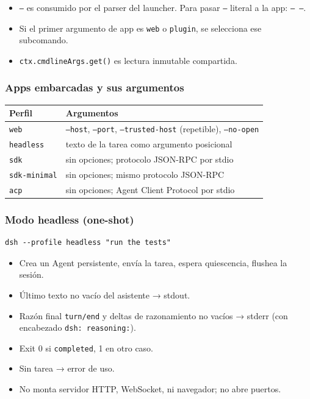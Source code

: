 \documentclass[11pt,a4paper]{article}
\begin{document}
\begin{itemize}[leftmargin=*,topsep=2pt,itemsep=1pt]
  \item \texttt{--} es consumido por el parser del launcher. Para pasar \texttt{--} literal a la app: \texttt{-- --}.
  \item Si el primer argumento de app es \texttt{web} o \texttt{plugin}, se selecciona ese subcomando.
  \item \texttt{ctx.cmdlineArgs.get()} es lectura inmutable compartida.
\end{itemize}


\subsubsection*{Apps embarcadas y sus argumentos}


\begin{center}
\begin{tabular}{@{}ll@{}}
\toprule
Perfil & Argumentos \\
\midrule
\texttt{web} & \texttt{--host}, \texttt{--port}, \texttt{--trusted-host} (repetible), \texttt{--no-open} \\
\texttt{headless} & texto de la tarea como argumento posicional \\
\texttt{sdk} & sin opciones; protocolo JSON-RPC por stdio \\
\texttt{sdk-minimal} & sin opciones; mismo protocolo JSON-RPC \\
\texttt{acp} & sin opciones; Agent Client Protocol por stdio \\
\bottomrule
\end{tabular}
\end{center}



\subsubsection*{Modo headless (one-shot)}


\begin{lstlisting}
dsh --profile headless "run the tests"
\end{lstlisting}


\begin{itemize}[leftmargin=*,topsep=2pt,itemsep=1pt]
  \item Crea un Agent persistente, envía la tarea, espera quiescencia, flushea la sesión.
  \item Último texto no vacío del asistente → stdout.
  \item Razón final \texttt{turn/end} y deltas de razonamiento no vacíos → stderr (con encabezado \texttt{dsh: reasoning:}).
  \item Exit 0 si \texttt{completed}, 1 en otro caso.
  \item Sin tarea → error de uso.
  \item No monta servidor HTTP, WebSocket, ni navegador; no abre puertos.
\end{itemize}
\end{document}
